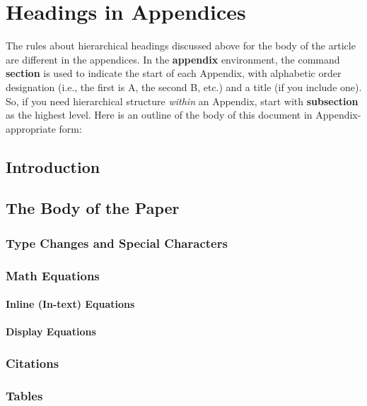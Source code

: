 \section{Headings in Appendices}
The rules about hierarchical headings discussed above for
the body of the article are different in the appendices.
In the \textbf{appendix} environment, the command
\textbf{section} is used to
indicate the start of each Appendix, with alphabetic order
designation (i.e., the first is A, the second B, etc.) and
a title (if you include one). So, if you need
hierarchical structure
\textit{within} an Appendix, start with \textbf{subsection} as the
highest level. Here is an outline of the body of this
document in Appendix-appropriate form:

\subsection{Introduction}

\subsection{The Body of the Paper}

\subsubsection{Type Changes and Special Characters}

\subsubsection{Math Equations}

\paragraph{Inline (In-text) Equations}

\paragraph{Display Equations}

\subsubsection{Citations}

\subsubsection{Tables}

